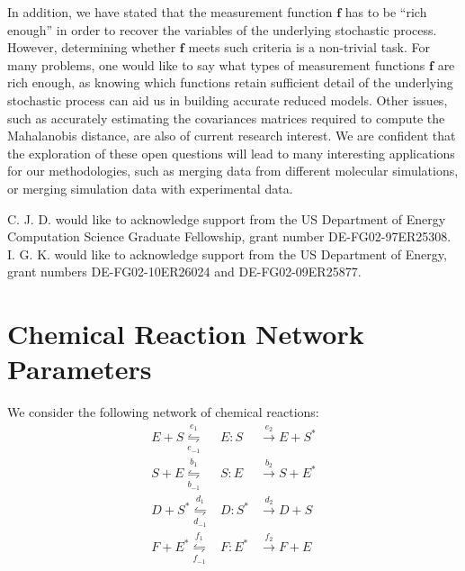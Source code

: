 \documentclass[aip,jcp,preprint]{revtex4-1}
\begin{document}
In addition, we have stated that the measurement function $\mathbf{f}$ has to be ``rich enough'' in order to recover the variables of the underlying stochastic process.
%
However, determining whether $\mathbf{f}$ meets such criteria is a non-trivial task.
%
For many problems, one would like to say what types of measurement functions $\mathbf{f}$ are rich enough, 
as knowing which functions retain sufficient detail of the underlying stochastic process can aid us in building accurate reduced models.
%
Other issues, such as accurately estimating the covariances matrices required to compute the Mahalanobis distance, are also of current research interest.
%
We are confident that the exploration of these open questions will lead to many interesting applications for our methodologies, such as merging data from different molecular simulations, or merging simulation data with experimental data.

\begin{acknowledgments}
C. J. D. would like to acknowledge support from the US Department of Energy Computation Science Graduate Fellowship, grant number DE-FG02-97ER25308.
%
I. G. K. would like to acknowledge support from the US Department of Energy, grant numbers DE-FG02-10ER26024 and DE-FG02-09ER25877.
\end{acknowledgments}



\appendix

\section{Chemical Reaction Network Parameters} \label{app:rxn}

We consider the following network of chemical reactions:
\begin{equation}
\begin{array}{rcl}
E + S \overset{e_1}{\underset{e_{-1}}{\leftrightharpoons}} & E:S & \overset{e_2}{\rightarrow} E + S^{*} \\
S + E \overset{b_1}{\underset{b_{-1}}{\leftrightharpoons}} & S:E & \overset{b_2}{\rightarrow} S + E^{*}\\
D + S^{*} \overset{d_1}{\underset{d_{-1}}{\leftrightharpoons}} & D:S^{*} & \overset{d_2}{\rightarrow} D + S\\
F + E^{*} \overset{f_1}{\underset{f_{-1}}{\leftrightharpoons}} & F:E^{*} & \overset{f_2}{\rightarrow} F + E
\end{array}
\end{equation}
\end{document}
